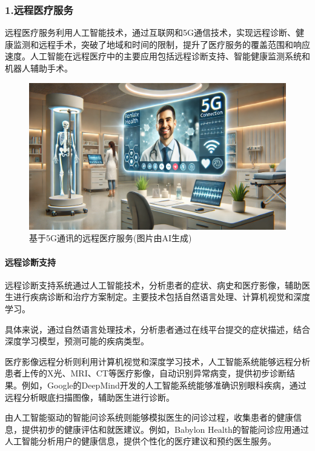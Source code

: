 \subsubsection{1.远程医疗服务}

远程医疗服务利用人工智能技术，通过互联网和5G通信技术，实现远程诊断、健康监测和远程手术，突破了地域和时间的限制，提升了医疗服务的覆盖范围和响应速度。人工智能在远程医疗中的主要应用包括远程诊断支持、智能健康监测系统和机器人辅助手术。

\begin{figure}[ht]
  \centering
  \includegraphics[width=\linewidth]{image/4/远程医疗.png}
  \caption{基于5G通讯的远程医疗服务(图片由AI生成)}
  \label{fig:远程医疗}
\end{figure}

\paragraph{远程诊断支持}

远程诊断支持系统通过人工智能技术，分析患者的症状、病史和医疗影像，辅助医生进行疾病诊断和治疗方案制定。主要技术包括自然语言处理、计算机视觉和深度学习。

具体来说，通过自然语言处理技术，分析患者通过在线平台提交的症状描述，结合深度学习模型，预测可能的疾病类型。

医疗影像远程分析则利用计算机视觉和深度学习技术，人工智能系统能够远程分析患者上传的X光、MRI、CT等医疗影像，自动识别异常病变，提供初步诊断结果。例如，Google的DeepMind开发的人工智能系统能够准确识别眼科疾病，通过远程分析眼底扫描图像，辅助医生进行诊断。

由人工智能驱动的智能问诊系统则能够模拟医生的问诊过程，收集患者的健康信息，提供初步的健康评估和就医建议。例如，Babylon Health的智能问诊应用通过人工智能分析用户的健康信息，提供个性化的医疗建议和预约医生服务。


